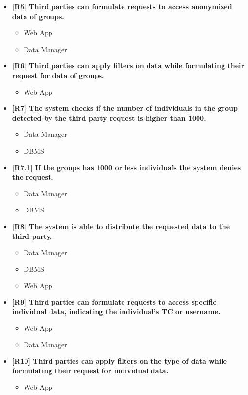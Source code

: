 \begin{itemize}
\item \textbf{[R5] Third parties can formulate requests to access anonymized data of groups.}
\begin{itemize}
\item Web App
\item Data Manager
\end{itemize}

\item \textbf{[R6] Third parties can apply filters on data while formulating their request for data of groups.}
\begin{itemize}
\item Web App
\end{itemize}


\item \textbf{[R7] The system checks if the number of individuals in the group detected by the third party request is higher than 1000.}
\begin{itemize}
\item Data Manager
\item DBMS
\end{itemize}


\item \textbf{[R7.1] If the groups has 1000 or less individuals the system denies the request.}
\begin{itemize}
\item Data Manager
\item DBMS
\end{itemize}


\item \textbf{[R8] The system is able to distribute the requested data to the third party.}
\begin{itemize}
\item Data Manager
\item DBMS
\item Web App
\end{itemize}

\item \textbf{[R9] Third parties can formulate requests to access specific individual data, indicating the individual’s TC or username.}
\begin{itemize}
\item Web App
\item Data Manager
\end{itemize}

\item \textbf{[R10] Third parties can apply filters on the type of data while formulating their request for individual data.}
\begin{itemize}
\item Web App
\end{itemize}


\end{itemize}
